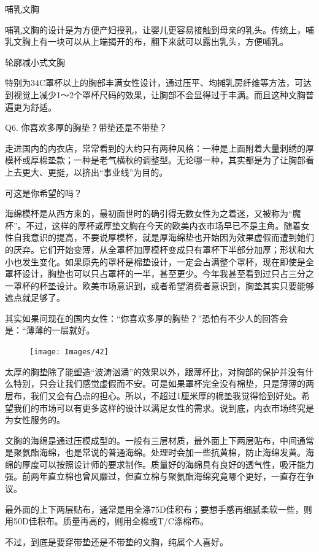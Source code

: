 \documentclass[12pt,UTF8]{ctexbook}
\begin{document}
哺乳文胸

哺乳文胸的设计是为方便产妇授乳，让婴儿更容易接触到母亲的乳头。传统上，哺乳文胸上有一块可以从上端揭开的布，翻下来就可以露出乳头，方便哺乳。

轮廓减小式文胸

特别为34C罩杯以上的胸部丰满女性设计，通过压平、均摊乳房纤维等方法，可达到视觉上减少1～2个罩杯尺码的效果，让胸部不会显得过于丰满。而且这种文胸普遍更为舒适。

Q6. 你喜欢多厚的胸垫？带垫还是不带垫？

走进国内的内衣店，常常看到的大约只有两种风格：一种是上面附着大量刺绣的厚模杯或厚棉垫款；一种是老气横秋的调整型。无论哪一种，其实都是为了让胸部看上去更大、更挺，以挤出“事业线”为目的。

可这是你希望的吗？

海绵模杯是从西方来的，最初面世时的确引得无数女性为之着迷，又被称为“魔杯”。不过，这样的厚杯或厚垫文胸在今天的欧美内衣市场早已不是主角。随着女性自我意识的提高，不要说厚模杯，就是厚海绵垫也开始因为效果虚假而遭到她们的厌弃。它们开始变薄，从全罩杯加厚模杯变成只有罩杯下半部分加厚；形状和大小也发生变化。如果原先的罩杯是棉垫设计，一定会占满整个罩杯，现在即使是全罩杯设计，胸垫也可以只占罩杯的一半，甚至更少。今年我甚至看到过只占三分之一罩杯的杯垫设计。欧美市场意识到，或者希望消费者意识到，胸垫其实只要能够遮点就足够了。

其实如果问现在的国内女性：“你喜欢多厚的胸垫？”恐怕有不少人的回答会是：“薄薄的一层就好。

\begin{figure}[htbp]
	\centering
	\texttt{[image: Images/42]}
	\caption{}
	\label{fig:1}
\end{figure}

太厚的胸垫除了能塑造“波涛汹涌”的效果以外，跟薄杯比，对胸部的保护并没有什么特别，只会让我们感觉虚假而不安。可是如果罩杯完全没有棉垫，只是薄薄的两层布，我们又会有凸点的担心。所以，不超过1厘米厚的棉垫我觉得恰到好处。希望我们的市场可以有更多这样的设计以满足女性的需求。说到底，内衣市场终究是为女性服务的。

文胸的海绵是通过压模成型的。一般有三层材质，最外面上下两层贴布，中间通常是聚氨酯海绵，也是常说的普通海绵。处理时会加一些抗黄棉，防止海绵发黄。海绵的厚度可以按照设计师的要求制作。质量好的海绵具有良好的透气性，吸汗能力强。前两年直立棉也曾风靡过，但直立棉与聚氨酯海绵究竟哪个更好，一直存在争议。

最外面的上下两层贴布，通常是用全涤75D佳积布；要想手感再细腻柔软一些，则用50D佳积布。质量再高的，则用全棉或T/C涤棉布。

不过，到底是要穿带垫还是不带垫的文胸，纯属个人喜好。
\end{document}
